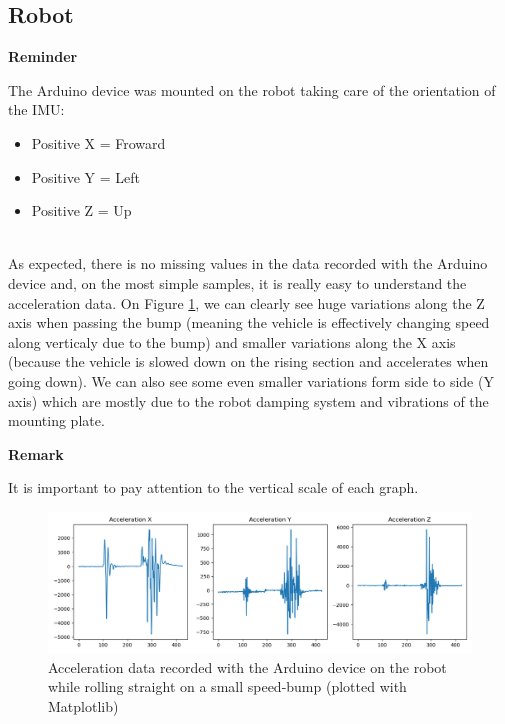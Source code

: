 \subsection{Robot}

\noindent
\begin{minipage}[!hc]{0.12\textwidth}
   \textbf{Reminder}
\end{minipage}
\vrule\enskip\vrule\quad\begin{minipage}{\dimexpr 0.87\textwidth-0.8pt-1.5em}
The Arduino device was mounted on the robot taking care of the orientation of the IMU:
\begin{itemize}
    \item Positive X = Froward
    \item Positive Y = Left
    \item Positive Z = Up
\end{itemize}
\end{minipage}
\\
As expected, there is no missing values in the data recorded with the Arduino device and, on the most simple samples, it is really easy to understand the acceleration data. On Figure \ref{bump_1}, we can clearly see huge variations along the Z axis when passing the bump (meaning the vehicle is effectively changing speed along verticaly due to the bump) and smaller variations along the X axis (because the vehicle is slowed down on the rising section and accelerates when going down). We can also see some even smaller variations form side to side (Y axis) which are mostly due to the robot damping system and vibrations of the mounting plate.\\

\noindent
\begin{minipage}[!hc]{0.12\textwidth}
   \textbf{Remark}
\end{minipage}
\vrule\enskip\vrule\quad\begin{minipage}{\dimexpr 0.87\textwidth-0.8pt-1.5em}
It is important to pay attention to the vertical scale of each graph.
\end{minipage}

\begin{figure}
    \center
    \includegraphics[scale=0.5]{img/DATA1.png}
    \caption{Acceleration data recorded with the Arduino device on the robot while rolling straight on a small speed-bump (plotted with Matplotlib)}
    \label{bump_1}
\end{figure}

